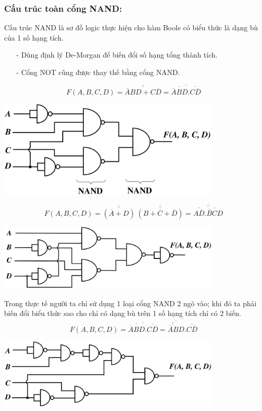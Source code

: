 \subsubsection{Cấu trúc toàn cổng NAND:}
Cấu trúc NAND là sơ đồ logic thực hiện cho hàm Boole có biểu thức là dạng bù của 1 số hạng tích.
\begin{itemize}
    \item[-] Dùng định lý De-Morgan để biến đổi số hạng tổng thành tích.
    \item[-] Cổng NOT cũng được thay thế bằng cổng NAND.
\end{itemize}
\[
    F(A,B,C,D) = \overline{\overline{\overline{A}BD + C\overline{D}}} = \overline{\overline{\overline{A}BD}.\overline{C\overline{D}}}
\]
\begin{center}
    \includegraphics[width = 0.8\textwidth]{./local/image/43.png}
\end{center}
\[ 
    F(A,B,C,D) = \overline{\overline{(\overline{A} + D)}}\ \overline{\overline{(B+ \overline{C} + \overline{D})}} = \overline{\overline{\overline{A\overline{D}}.\overline{\overline{B}CD}}}
\]
\begin{center}
    \includegraphics[width = 0.8\textwidth]{./local/image/44.png}
\end{center}
Trong thực tế người ta chỉ sử dụng 1 loại cổng NAND 2 ngõ vào; khi đó ta phải biến đổi biểu thức sao cho chỉ có dạng bù trên 1 số hạng tích chỉ có 2 biến.
\[
    F(A,B,C,D) = \overline{\overline{\overline{A}BD}.\overline{C\overline{D}}} = \overline{\overline{\overline{\overline{\overline{A}B}}D}.\overline{C\overline{D}}}
\]
\begin{center}
    \includegraphics[width = 0.8\textwidth]{./local/image/45.png}
\end{center}
